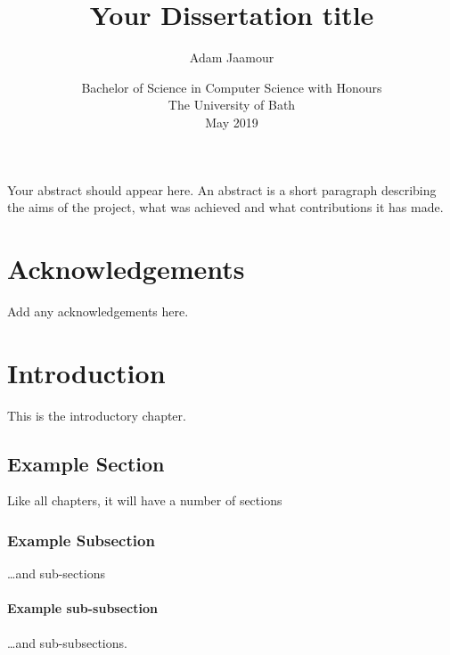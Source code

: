 \documentclass[11pt,openright,twoside,a4paper]{report}
\title{Your Dissertation title}
\author{Adam Jaamour}
\date{Bachelor of Science in Computer Science with Honours\\The University of Bath\\May 2019}
\begin{document}
\lstset{language=Java,breaklines,breakatwhitespace,basicstyle=\small}


\setcounter{page}{0}


\maketitle
\newpage


\newpage


\newpage


\abstract
Your abstract should appear here.  An abstract is a short
paragraph describing the aims of the project, what was
achieved and what contributions it has made.
\newpage


\tableofcontents
\newpage
\listoffigures
\newpage
\listoftables
\newpage


\chapter*{Acknowledgements}
Add any acknowledgements here.
\newpage


\setcounter{page}{1}



\chapter{Introduction}
%

This is the introductory chapter.

\section{Example Section}
Like all chapters, it will have a number of sections

\subsection{Example Subsection}
\ldots and sub-sections

\subsubsection{Example sub-subsection}
\ldots and sub-subsections.
\end{document}

